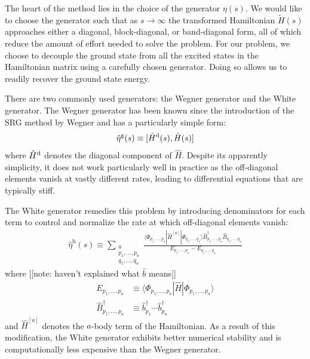 \documentclass[amsmath, amssymb, aps, floatfix, nofootinbib, preprintnumbers,showpacs, superscriptaddress, twocolumn]{revtex4-1}
\begin{document}
The heart of the method lies in the choice of the generator $\eta(s)$.  We
would like to choose the generator such that as $s \to \infty$ the transformed
Hamiltonian $\tilde H(s)$ approaches either a diagonal, block-diagonal, or
band-diagonal form, all of which reduce the amount of effort needed to solve
the problem.  For our problem, we choose to decouple the ground state from all
the excited states in the Hamiltonian matrix using a carefully chosen
generator.  Doing so allows us to readily recover the ground state energy.

There are two commonly used generators: the Wegner generator and the White
generator.  The Wegner generator has been known since the introduction of the
SRG method by Wegner\cite{PhysRepWegner0} and has a particularly simple form:
\begin{align*}
  \hat \eta^{\text{g}}(s) \equiv [\hat H^{\text d}(s), \hat H(s)]
\end{align*}
where $\hat H^{\text d}$ denotes the diagonal component of $\hat H$.  Despite
its apparently simplicity, it does not work particularly well in practice as
the off-diagonal elements vanish at vastly different rates, leading to
differential equations that are typically stiff.

The White generator remedies this problem by introducing denominators for each
term to control and normalize the rate at which off-diagonal elements vanish:
\begin{align*}
  \hat \eta^{\text{h}}(s) \equiv
  \sum_{\substack{a \\ p_1, \ldots, p_a \\ q_1, \ldots, q_a}}
  \frac{
  \langle \Phi_{p_1, \ldots, p_a} | \hat H^{[a]} | \Phi_{q_1, \ldots, q_a} \rangle
  \hat B_{p_1, \ldots, p_a}^\dagger \hat B_{q_1, \ldots, q_a}^{}
  }{E_{p_1, \ldots, p_a} - E_{q_1, \ldots, q_a}}
\end{align*}
where [[note: haven't explained what $\hat b$ means]]
\begin{align*}
  E_{p_1, \ldots, p_a} &\equiv
  \langle \Phi_{p_1, \ldots, p_a} | \hat H | \Phi_{p_1, \ldots, p_a} \rangle \\
  \hat B_{p_1, \ldots, p_a}^\dagger &\equiv
  \hat b_{p_1}^\dagger \cdots \hat b_{p_a}^\dagger
\end{align*}
and $\hat H^{[a]}$ denotes the $a$-body term of the Hamiltonian.  As a result
of this modification, the White generator exhibits better numerical stability
and is computationally less expensive than the Wegner generator.
\end{document}
